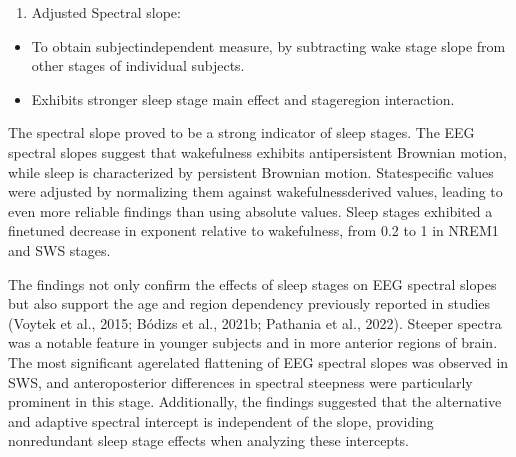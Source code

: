 \documentclass[letterpaper,10pt,english]{sphinxmanual}
\begin{document}

\sphinxAtStartPar
{}
\begin{enumerate}
%
\setcounter{enumi}{4}
\item {} 
\sphinxAtStartPar
Adjusted Spectral slope:

\end{enumerate}
\begin{itemize}
\item {} 
\sphinxAtStartPar
To obtain subject\sphinxhyphen{}independent measure, by subtracting wake stage slope from other stages of individual subjects.

\item {} 
\sphinxAtStartPar
Exhibits stronger sleep stage main effect and stage\sphinxhyphen{}region interaction.

\end{itemize}


\sphinxAtStartPar
{}

\sphinxAtStartPar
{}

\sphinxAtStartPar
The spectral slope proved to be a strong indicator of sleep stages. The EEG spectral slopes suggest that wakefulness exhibits antipersistent Brownian motion, while sleep is characterized by persistent Brownian motion. State\sphinxhyphen{}specific values were adjusted by normalizing them against wakefulness\sphinxhyphen{}derived values, leading to even more reliable findings than using absolute values. Sleep stages exhibited a fine\sphinxhyphen{}tuned decrease in exponent relative to wakefulness, from \sphinxhyphen{}0.2 to \sphinxhyphen{}1 in NREM1 and SWS stages.

\sphinxAtStartPar
The findings not only confirm the effects of sleep stages on EEG spectral slopes but also support the age and region dependency previously reported in studies (Voytek et al., 2015; Bódizs et al., 2021b; Pathania et al., 2022). Steeper spectra was a notable feature in younger subjects and in more anterior regions of brain. The most significant age\sphinxhyphen{}related flattening of EEG spectral slopes was observed in SWS, and antero\sphinxhyphen{}posterior differences in spectral steepness were particularly prominent in this stage. Additionally, the findings suggested that the alternative and adaptive spectral intercept is independent of the slope, providing non\sphinxhyphen{}redundant sleep stage effects when analyzing these intercepts.
\end{document}
